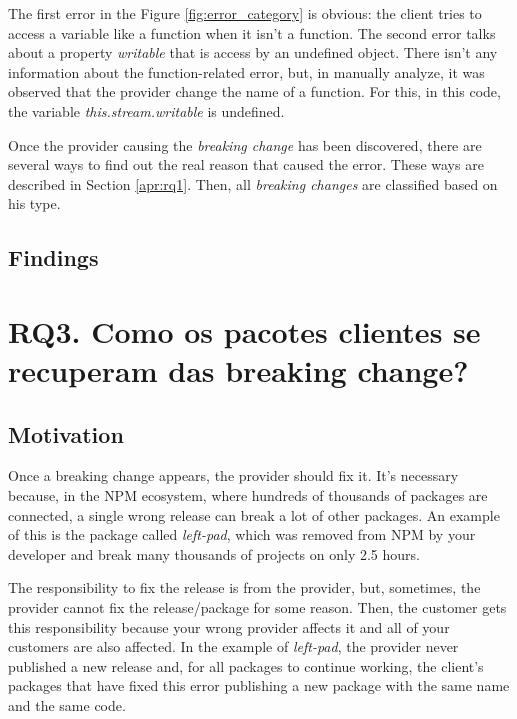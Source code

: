 The first error in the Figure \ref{fig:error_category} is obvious: the client tries to access a variable like a function when it isn't a function. The second error talks about a property \textit{writable} that is access by an undefined object. There isn't any information about the function-related error, but, in manually analyze, it was observed that the provider change the name of a function. For this, in this code, the variable \textit{this.stream.writable} is undefined.

Once the provider causing the \textit{breaking change} has been discovered, there are several ways to find out the real reason that caused the error. These ways are described in Section \ref{apr:rq1}. Then, all \textit{breaking changes} are classified based on his type.

\subsection{Findings}
\label{fin:rq2}

\section{RQ3. Como os pacotes clientes se recuperam das breaking change?}
\label{sec:rq3}

\subsection{Motivation}
\label{mot:rq3}

Once a breaking change appears, the provider should fix it. It’s necessary because, in the \Gls{NPM} ecosystem, where hundreds of thousands of packages are connected, a single wrong release can break a lot of other packages. An example of this is the package called \textit{left-pad}, which was removed from \Gls{NPM} by your developer and break many thousands of projects on only 2.5 hours.

The responsibility to fix the release is from the provider, but, sometimes, the provider cannot fix the release/package for some reason. Then, the customer gets this responsibility because your wrong provider affects it and all of your customers are also affected. In the example of \textit{left-pad}, the provider never published a new release and, for all packages to continue working, the client's packages that have fixed this error publishing a new package with the same name and the same code.

